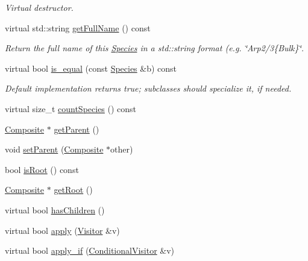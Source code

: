 \begin{DoxyCompactItemize}
\begin{DoxyCompactList}\small\item\em Virtual destructor. \end{DoxyCompactList}\item 
virtual std\-::string \hyperlink{classchem_1_1Species_a7ac7196a7146f63e297d0995c6081f4b}{get\-Full\-Name} () const 
\begin{DoxyCompactList}\small\item\em Return the full name of this \hyperlink{classchem_1_1Species}{Species} in a std\-::string format (e.\-g. \char`\"{}\-Arp2/3\{\-Bulk\}\char`\"{}. \end{DoxyCompactList}\item 
virtual bool \hyperlink{classchem_1_1Species_ac01be786c36974eb1e288b1bfdbf02f2}{is\-\_\-equal} (const \hyperlink{classchem_1_1Species}{Species} \&b) const 
\begin{DoxyCompactList}\small\item\em Default implementation returns true; subclasses should specialize it, if needed. \end{DoxyCompactList}\item 
virtual size\-\_\-t \hyperlink{classchem_1_1Species_a5e8aedfe4c4b5e08fb0ee672c3d80ace}{count\-Species} () const 
\item 
\hyperlink{classchem_1_1Composite}{Composite} $\ast$ \hyperlink{classchem_1_1Component_a32812270ee52f07ceae2194c56864fd6}{get\-Parent} ()
\item 
void \hyperlink{classchem_1_1Component_a1f4e4d1566f1d3026f1e2a14fa3dffd9}{set\-Parent} (\hyperlink{classchem_1_1Composite}{Composite} $\ast$other)
\item 
bool \hyperlink{classchem_1_1Component_a75cd13a0d884f82fcddd574de33fbfe6}{is\-Root} () const 
\item 
\hyperlink{classchem_1_1Composite}{Composite} $\ast$ \hyperlink{classchem_1_1Component_a7f1166f8fb4c9526cd1794ec3c2714f5}{get\-Root} ()
\item 
virtual bool \hyperlink{classchem_1_1Component_aca92f700484a1ad36c2e656e307fe263}{has\-Children} ()
\item 
virtual bool \hyperlink{classchem_1_1Component_ae9efcf2fb203ab7514f81f04d7e4dec2}{apply} (\hyperlink{classchem_1_1Visitor}{Visitor} \&v)
\item 
virtual bool \hyperlink{classchem_1_1Component_ac40e9d75a554324ba1d007a2d5234a38}{apply\-\_\-if} (\hyperlink{classchem_1_1ConditionalVisitor}{Conditional\-Visitor} \&v)
\end{DoxyCompactItemize}
